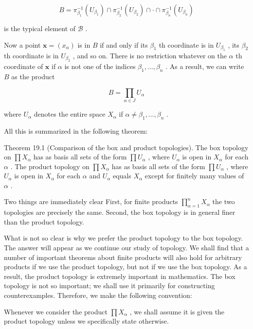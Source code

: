 \[
B = {\pi }_{{\beta }_{1}}^{-1}\left( {U}_{{\beta }_{1}}\right)  \cap  {\pi }_{{\beta }_{2}}^{-1}\left( {U}_{{\beta }_{2}}\right)  \cap   \cdot   \cap  {\pi }_{{\beta }_{n}}^{-1}\left( {U}_{{\beta }_{n}}\right)
\]

is the typical element of \(\mathcal{B}\) .

Now a point \(\mathbf{x} = \left( {x}_{\alpha }\right)\) is in \(B\) if and only if its \({\beta }_{1}\) th coordinate is in \({U}_{{\beta }_{1}}\) , its \({\beta }_{2}\) th coordinate is in \({U}_{{\beta }_{2}}\) , and so on. There is no restriction whatever on the \(\alpha\) th coordinate of \(\mathbf{x}\) if \(\alpha\) is not one of the indices \({\beta }_{1},\ldots ,{\beta }_{n}\) . As a result, we can write \(B\) as the product

\[
B = \mathop{\prod }\limits_{{\alpha  \in  J}}{U}_{\alpha }
\]

where \({U}_{\alpha }\) denotes the entire space \({X}_{\alpha }\) if \(\alpha  \neq  {\beta }_{1},\ldots ,{\beta }_{n}\) .

All this is summarized in the following theorem:

Theorem 19.1 (Comparison of the box and product topologies). The box topology on \(\prod {X}_{\alpha }\) has as basis all sets of the form \(\prod {U}_{\alpha }\) , where \({U}_{\alpha }\) is open in \({X}_{\alpha }\) for each \(\alpha\) . The product topology on \(\prod {X}_{\alpha }\) has as basis all sets of the form \(\prod {U}_{\alpha }\) , where \({U}_{\alpha }\) is open in \({X}_{\alpha }\) for each \(\alpha\) and \({U}_{\alpha }\) equals \({X}_{\alpha }\) except for finitely many values of \(\alpha\) .

Two things are immediately clear First, for finite products \(\mathop{\prod }\limits_{{\alpha  = 1}}^{n}{X}_{\alpha }\) the two topologies are precisely the same. Second, the box topology is in general finer than the product topology.

What is not so clear is why we prefer the product topology to the box topology. The answer will appear as we continue our study of topology. We shall find that a number of important theorems about finite products will also hold for arbitrary products if we use the product topology, but not if we use the box topology. As a result, the product topology is extremely important in mathematics. The box topology is not so important; we shall use it primarily for constructing counterexamples. Therefore, we make the following convention:

Whenever we consider the product \(\prod {X}_{\alpha }\) , we shall assume it is given the product topology unless we specifically state otherwise.

